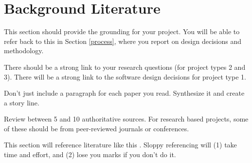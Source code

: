 \section{Background Literature}\label{backg}

This section should provide the grounding for your project. You will be able to refer back to this in Section \ref{process}, where you report on design decisions and methodology.

There should be a strong link to your research questions (for project types 2 and 3). There will be a strong link to the software design decisions for project type 1.

Don't just include a paragraph for each paper you read. Synthesize it and create a story line. 

Review between 5 and 10 authoritative sources. For research based projects, some of these should be from peer-reviewed journals or conferences. 

This section will reference literature like this \cite{turing1950computing}. Sloppy referencing will (1) take time and effort, and (2) lose you marks if you don't do it.

